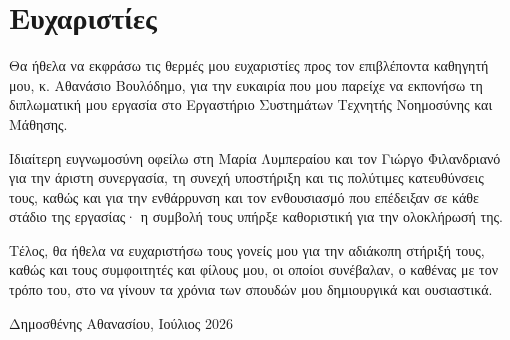 \chapter*{Ευχαριστίες}

Θα ήθελα να εκφράσω τις θερμές μου ευχαριστίες προς τον επιβλέποντα καθηγητή μου, κ. Αθανάσιο Βουλόδημο, για την ευκαιρία που μου παρείχε να εκπονήσω τη διπλωματική μου εργασία στο Εργαστήριο Συστημάτων Τεχνητής Νοημοσύνης και Μάθησης.

Ιδιαίτερη ευγνωμοσύνη οφείλω στη Μαρία Λυμπεραίου και τον Γιώργο Φιλανδριανό για την άριστη συνεργασία, τη συνεχή υποστήριξη και τις πολύτιμες κατευθύνσεις τους, καθώς και για την ενθάρρυνση και τον ενθουσιασμό που επέδειξαν σε κάθε στάδιο της εργασίας· η συμβολή τους υπήρξε καθοριστική για την ολοκλήρωσή της.

Τέλος, θα ήθελα να ευχαριστήσω τους γονείς μου για την αδιάκοπη στήριξή τους, καθώς και τους συμφοιτητές και φίλους μου, οι οποίοι συνέβαλαν, ο καθένας με τον τρόπο του, στο να γίνουν τα χρόνια των σπουδών μου δημιουργικά και ουσιαστικά.

\vspace{1cm}
\begin{flushright}
    Δημοσθένης Αθανασίου,
    Ιούλιος 2026
\end{flushright}